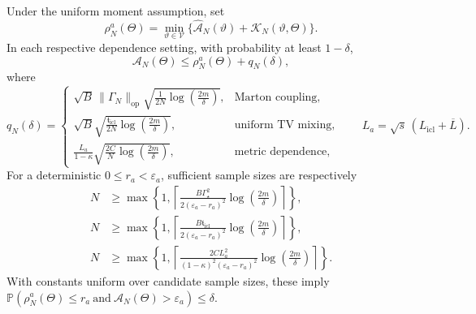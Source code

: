\begin{proposition}
\label{prop:ICL unsquared bounds}
Under the uniform moment assumption, set
\[
\rho_N^a(\Theta)=\min_{\vartheta\in\mathcal V}
\{\widehat{\mathcal A}_N(\vartheta)+\mathcal K_N(\vartheta,\Theta)\}.
\]
In each respective dependence setting, with probability at least \(1-\delta\),
\begin{equation}
\label{eq:ICL unsquared bound}
\mathcal A_N(\Theta)\leqslant\rho_N^a(\Theta)+q_N(\delta),
\end{equation}
where
\begin{equation}
\label{eq:ICL unsquared penalties}
q_N(\delta)=
\begin{cases}
\displaystyle\sqrt B\,\|\Gamma_N\|_{\mathrm{op}}
\sqrt{\frac{1}{2N}\log\left(\frac{2m}{\delta}\right)},&\text{Marton coupling},\\[2mm]
\displaystyle\sqrt B\sqrt{\frac{\mathfrak t_{\mathrm{icl}}}{2N}
\log\left(\frac{2m}{\delta}\right)},&\text{uniform TV mixing},\\[2mm]
\displaystyle\frac{L_a}{1-\kappa}
\sqrt{\frac{2C}{N}\log\left(\frac{2m}{\delta}\right)},&\text{metric dependence},
\end{cases}
\qquad L_a=\sqrt s\,(L_{\mathrm{icl}}+\overline L).
\end{equation}
For a deterministic \(0\leqslant r_a<\varepsilon_a\), sufficient sample sizes are respectively
\begin{equation}
\label{eq:ICL unsquared sample complexity}
\begin{aligned}
N&\geqslant\max\left\{1,\left\lceil
\frac{B\Gamma_\star^2}{2(\varepsilon_a-r_a)^2}
\log\left(\frac{2m}{\delta}\right)\right\rceil\right\},\\
N&\geqslant\max\left\{1,\left\lceil
\frac{B\mathfrak t_{\mathrm{icl}}}{2(\varepsilon_a-r_a)^2}
\log\left(\frac{2m}{\delta}\right)\right\rceil\right\},\\
N&\geqslant\max\left\{1,\left\lceil
\frac{2CL_a^2}{(1-\kappa)^2(\varepsilon_a-r_a)^2}
\log\left(\frac{2m}{\delta}\right)\right\rceil\right\}.
\end{aligned}
\end{equation}
With constants uniform over candidate sample sizes, these imply
\(\mathbb P(\rho_N^a(\Theta)\leqslant r_a\ \text{and}\ \mathcal A_N(\Theta)>\varepsilon_a)\leqslant\delta\).
\end{proposition}

